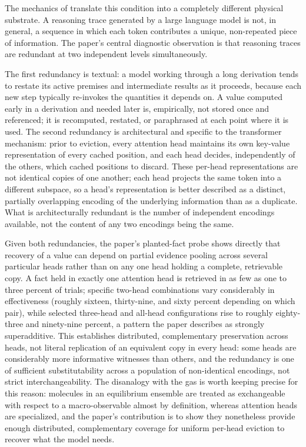 \documentclass[11pt]{article}
\begin{document}
The mechanics of \citet{wang2026random} translate this condition into a completely different physical substrate. A reasoning trace generated by a large language model is not, in general, a sequence in which each token contributes a unique, non-repeated piece of information. The paper's central diagnostic observation is that reasoning traces are redundant at two independent levels simultaneously.

The first redundancy is textual: a model working through a long derivation tends to restate its active premises and intermediate results as it proceeds, because each new step typically re-invokes the quantities it depends on. A value computed early in a derivation and needed later is, empirically, not stored once and referenced; it is recomputed, restated, or paraphrased at each point where it is used. The second redundancy is architectural and specific to the transformer mechanism: prior to eviction, every attention head maintains its own key-value representation of every cached position, and each head decides, independently of the others, which cached positions to discard. These per-head representations are not identical copies of one another; each head projects the same token into a different subspace, so a head's representation is better described as a distinct, partially overlapping encoding of the underlying information than as a duplicate. What is architecturally redundant is the number of independent encodings available, not the content of any two encodings being the same.

Given both redundancies, the paper's planted-fact probe shows directly that recovery of a value can depend on partial evidence pooling across several particular heads rather than on any one head holding a complete, retrievable copy. A fact held in exactly one attention head is retrieved in as few as one to three percent of trials; specific two-head combinations vary considerably in effectiveness (roughly sixteen, thirty-nine, and sixty percent depending on which pair), while selected three-head and all-head configurations rise to roughly eighty-three and ninety-nine percent, a pattern the paper describes as strongly superadditive. This establishes distributed, complementary preservation across heads, not literal replication of an equivalent copy in every head: some heads are considerably more informative witnesses than others, and the redundancy is one of sufficient substitutability across a population of non-identical encodings, not strict interchangeability. The disanalogy with the gas is worth keeping precise for this reason: molecules in an equilibrium ensemble are treated as exchangeable with respect to a macro-observable almost by definition, whereas attention heads are specialized, and the paper's contribution is to show they nonetheless provide enough distributed, complementary coverage for uniform per-head eviction to recover what the model needs.
\end{document}
